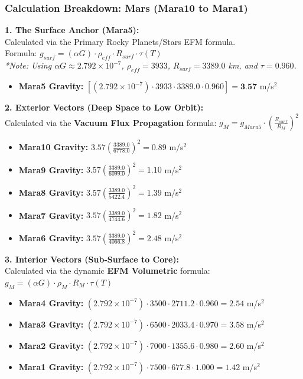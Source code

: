 \documentclass[11pt, a4paper]{article}
\begin{document}
\clearpage
\subsubsection{Calculation Breakdown: Mars (Mara10 to Mara1)}

\noindent \textbf{1. The Surface Anchor (Mara5):} \\
Calculated via the Primary Rocky Planets/Stars EFM formula. \\
Formula: $g_{surf} = (\alpha G) \cdot \rho_{eff} \cdot R_{surf} \cdot \tau(T)$ \\
\textit{*Note: Using $\alpha G \approx 2.792 \times 10^{-7}$, $\rho_{eff} = 3933$, $R_{surf} = 3389.0$ km, and $\tau = 0.960$.}
\begin{itemize}
  \item \textbf{Mara5 Gravity:} $\left[ (2.792 \times 10^{-7}) \cdot 3933 \cdot 3389.0 \cdot 0.960 \right] = \textbf{3.57}$ m/s$^2$
\end{itemize}

\vspace{0.5em}
\noindent \textbf{2. Exterior Vectors (Deep Space to Low Orbit):} \\
Calculated via the \textbf{Vacuum Flux Propagation} formula: $g_M = g_{Mara5} \cdot \left( \frac{R_{surf}}{R_M} \right)^2$
\begin{itemize}
  \item \textbf{Mara10 Gravity:} $3.57 \left( \frac{3389.0}{6778.0} \right)^2 = 0.89$ m/s$^2$
  \item \textbf{Mara9 Gravity:} $3.57 \left( \frac{3389.0}{6099.0} \right)^2 = 1.10$ m/s$^2$
  \item \textbf{Mara8 Gravity:} $3.57 \left( \frac{3389.0}{5422.4} \right)^2 = 1.39$ m/s$^2$
  \item \textbf{Mara7 Gravity:} $3.57 \left( \frac{3389.0}{4744.6} \right)^2 = 1.82$ m/s$^2$
  \item \textbf{Mara6 Gravity:} $3.57 \left( \frac{3389.0}{4066.8} \right)^2 = 2.48$ m/s$^2$
\end{itemize}

\vspace{0.5em}
\noindent \textbf{3. Interior Vectors (Sub-Surface to Core):} \\
Calculated via the dynamic \textbf{EFM Volumetric} formula: $g_M = (\alpha G) \cdot \rho_{M} \cdot R_M \cdot \tau(T)$
\begin{itemize}
  \item \textbf{Mara4 Gravity:} $(2.792 \times 10^{-7}) \cdot 3500 \cdot 2711.2 \cdot 0.960 = 2.54$ m/s$^2$
  \item \textbf{Mara3 Gravity:} $(2.792 \times 10^{-7}) \cdot 6500 \cdot 2033.4 \cdot 0.970 = 3.58$ m/s$^2$
  \item \textbf{Mara2 Gravity:} $(2.792 \times 10^{-7}) \cdot 7000 \cdot 1355.6 \cdot 0.980 = 2.60$ m/s$^2$
  \item \textbf{Mara1 Gravity:} $(2.792 \times 10^{-7}) \cdot 7500 \cdot 677.8 \cdot 1.000 = 1.42$ m/s$^2$
\end{itemize}
\end{document}
